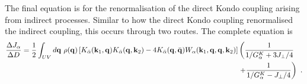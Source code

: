 \documentclass[%
reprint,
superscriptaddress,
groupedaddress,
superscriptaddress,
onecolumn,
10pt
]{revtex4-2}
\begin{document}
The final equation is for the renormalisation of the direct Kondo coupling arising from indirect processes. Similar to how the direct Kondo coupling renormalised the indirect coupling, this occurs through two routes. The complete equation is
\begin{equation}\begin{aligned}
	\frac{\Delta J_{\alpha}}{\Delta D} = \frac{1}{2}\int_{UV} d{\bf q} ~\rho({\bf q}) \left[K_{\bar\alpha}({\bf k}_1, {\bf q})K_{\bar\alpha}({\bf q}, {\bf k}_2) - 4K_{\bar\alpha}({\bf q}, \bar {\bf q})W_{\alpha}({\bf k}_1, {\bf q},  {\bf q}, {\bf k}_2)\right]& \left(\frac{1}{1/ G_{\alpha}^K + 3J_\perp/4}\right.\\
&\left.+ \frac{1}{1/ G_{\alpha}^K - J_\perp/4}\right)~.
\end{aligned}\end{equation}
\end{document}
